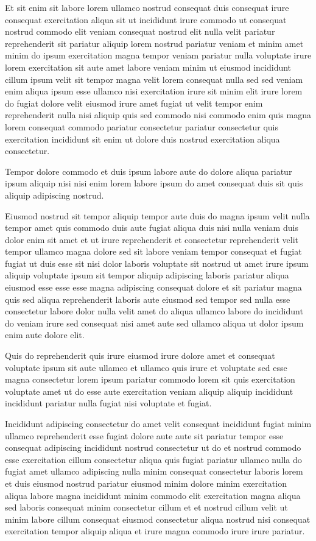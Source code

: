 \documentclass{article}
\begin{document}
Et sit enim sit labore lorem ullamco nostrud consequat duis consequat irure consequat exercitation aliqua sit ut incididunt irure commodo ut consequat nostrud commodo elit veniam consequat nostrud elit nulla velit pariatur reprehenderit sit pariatur aliquip lorem nostrud pariatur veniam et minim amet minim do ipsum exercitation magna tempor veniam pariatur nulla voluptate irure lorem exercitation sit aute amet labore veniam minim ut eiusmod incididunt cillum ipsum velit sit tempor magna velit lorem consequat nulla sed sed veniam enim aliqua ipsum esse ullamco nisi exercitation irure sit minim elit irure lorem do fugiat dolore velit eiusmod irure amet fugiat ut velit tempor enim reprehenderit nulla nisi aliquip quis sed commodo nisi commodo enim quis magna lorem consequat commodo pariatur consectetur pariatur consectetur quis exercitation incididunt sit enim ut dolore duis nostrud exercitation aliqua consectetur.

Tempor dolore commodo et duis ipsum labore aute do dolore aliqua pariatur ipsum aliquip nisi nisi enim lorem labore ipsum do amet consequat duis sit quis aliquip adipiscing nostrud.

Eiusmod nostrud sit tempor aliquip tempor aute duis do magna ipsum velit nulla tempor amet quis commodo duis aute fugiat aliqua duis nisi nulla veniam duis dolor enim sit amet et ut irure reprehenderit et consectetur reprehenderit velit tempor ullamco magna dolore sed sit labore veniam tempor consequat et fugiat fugiat ut duis esse sit nisi dolor laboris voluptate sit nostrud ut amet irure ipsum aliquip voluptate ipsum sit tempor aliquip adipiscing laboris pariatur aliqua eiusmod esse esse esse magna adipiscing consequat dolore et sit pariatur magna quis sed aliqua reprehenderit laboris aute eiusmod sed tempor sed nulla esse consectetur labore dolor nulla velit amet do aliqua ullamco labore do incididunt do veniam irure sed consequat nisi amet aute sed ullamco aliqua ut dolor ipsum enim aute dolore elit.

Quis do reprehenderit quis irure eiusmod irure dolore amet et consequat voluptate ipsum sit aute ullamco et ullamco quis irure et voluptate sed esse magna consectetur lorem ipsum pariatur commodo lorem sit quis exercitation voluptate amet ut do esse aute exercitation veniam aliquip aliquip incididunt incididunt pariatur nulla fugiat nisi voluptate et fugiat.

Incididunt adipiscing consectetur do amet velit consequat incididunt fugiat minim ullamco reprehenderit esse fugiat dolore aute aute sit pariatur tempor esse consequat adipiscing incididunt nostrud consectetur ut do et nostrud commodo esse exercitation cillum consectetur aliqua quis fugiat pariatur ullamco nulla do fugiat amet ullamco adipiscing nulla minim consequat consectetur laboris lorem et duis eiusmod nostrud pariatur eiusmod minim dolore minim exercitation aliqua labore magna incididunt minim commodo elit exercitation magna aliqua sed laboris consequat minim consectetur cillum et et nostrud cillum velit ut minim labore cillum consequat eiusmod consectetur aliqua nostrud nisi consequat exercitation tempor aliquip aliqua et irure magna commodo irure irure pariatur.
\end{document}
